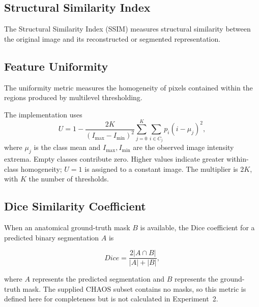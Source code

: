 \documentclass[review]{elsarticle}
\begin{document}


\subsection{Structural Similarity Index}

The Structural Similarity Index (SSIM) measures structural similarity
between the original image and its reconstructed or segmented
representation.



\subsection{Feature Uniformity}


The uniformity metric measures the homogeneity of pixels contained
within the regions produced by multilevel thresholding.

The implementation uses
\begin{equation}
U=1-\frac{2K}{(I_{\max}-I_{\min})^2}
\sum_{j=0}^{K}\sum_{i\in C_j}p_i(i-\mu_j)^2,
\end{equation}
where $\mu_j$ is the class mean and $I_{\max},I_{\min}$ are the observed
image intensity extrema. Empty classes contribute zero. Higher values
indicate greater within-class homogeneity; $U=1$ is assigned to a constant
image. The multiplier is $2K$, with $K$ the number of thresholds.



\subsection{Dice Similarity Coefficient}

When an anatomical ground-truth mask $B$ is available, the Dice coefficient
for a predicted binary segmentation $A$ is

\begin{equation}
Dice =
\frac{2|A \cap B|}
{|A|+|B|},
\end{equation}

where $A$ represents the predicted segmentation and $B$ represents the
ground-truth mask. The supplied CHAOS subset contains no masks, so this
metric is defined here for completeness but is not calculated in
Experiment~2.
\end{document}
